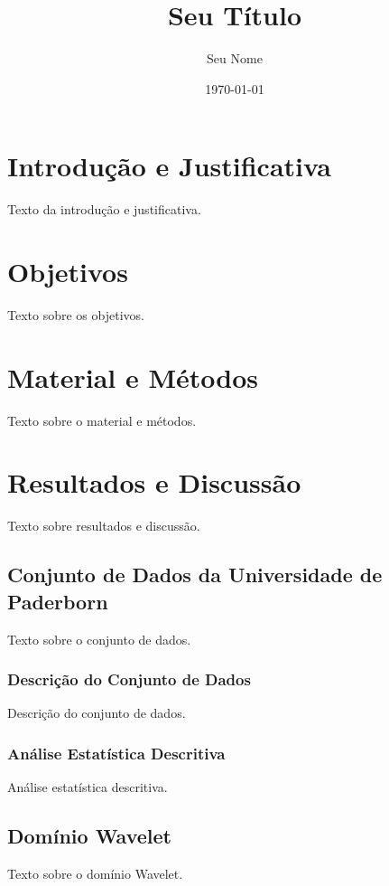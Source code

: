 \documentclass{article}
\begin{document}
\title{Seu Título}
\author{Seu Nome}
\date{\today}

\maketitle

\tableofcontents %

\section{Introdução e Justificativa}
Texto da introdução e justificativa.
\label{sec:introducao}

\section{Objetivos}
Texto sobre os objetivos.
\label{sec:objetivos}

\section{Material e Métodos}
Texto sobre o material e métodos.
\label{sec:metodos}

\section{Resultados e Discussão}
Texto sobre resultados e discussão.
\label{sec:resultados}

\subsection{Conjunto de Dados da Universidade de Paderborn}
Texto sobre o conjunto de dados.
\label{subsec:conjunto-dados}

\subsubsection{Descrição do Conjunto de Dados}
Descrição do conjunto de dados.
\label{subsubsec:descricao-dados}

\subsubsection{Análise Estatística Descritiva}
Análise estatística descritiva.
\label{subsubsec:analise-estatistica}

\subsection{Domínio Wavelet}
Texto sobre o domínio Wavelet.
\label{subsec:dominio-wavelet}
\end{document}
